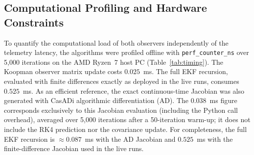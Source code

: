 \documentclass[asi,article,accept,pdftex,moreauthors]{Definitions/mdpi}
\begin{document}
\begin{table}[H]
  \caption{{Per-segment steady-state bias decomposition (cm, mean over five runs).}}
  \label{tab:real_bias}
  \footnotesize
\end{table}

\subsection{Computational Profiling and Hardware Constraints}
\label{sec:timing}

{To quantify the computational load of both observers independently of the telemetry latency, the algorithms were profiled offline with \texttt{perf\_counter\_ns} over 5,000 iterations on the AMD Ryzen~7 host PC (Table~\ref{tab:timing}). The Koopman observer matrix update costs $0.025$~ms. The full EKF recursion, evaluated with finite differences exactly as deployed in the live runs, consumes $0.525$~ms. As an efficient reference, the exact continuous-time Jacobian was also generated with CasADi algorithmic differentiation (AD). The $0.038$~ms figure corresponds exclusively to this Jacobian evaluation (including the Python call overhead), averaged over 5,000 iterations after a 50-iteration warm-up; it does not include the RK4 prediction nor the covariance update. For completeness, the full EKF recursion is $\approx 0.087$~ms with the AD Jacobian and $0.525$~ms with the finite-difference Jacobian used in the live runs.}
\end{document}
